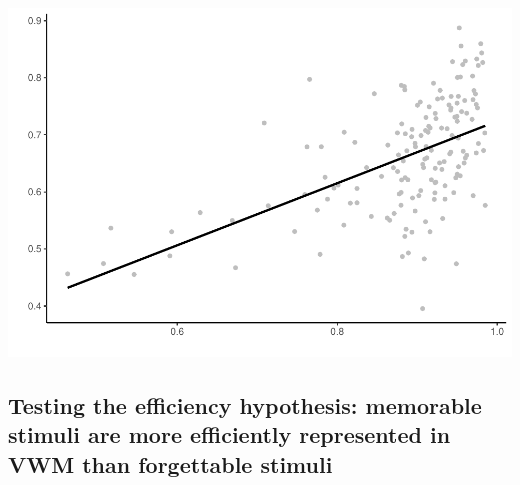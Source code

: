 \documentclass[
  man]{apa6}
\begin{document}
\includegraphics{Script_Re_Greer_2023_group1Rock_2023_files/figure-latex/unnamed-chunk-13-1.pdf}

\hypertarget{testing-the-efficiency-hypothesis-memorable-stimuli-are-more-efficiently-represented-in-vwm-than-forgettable-stimuli}{%
\subsection{Testing the efficiency hypothesis: memorable stimuli are more efficiently represented in VWM than forgettable stimuli}\label{testing-the-efficiency-hypothesis-memorable-stimuli-are-more-efficiently-represented-in-vwm-than-forgettable-stimuli}}
\end{document}
